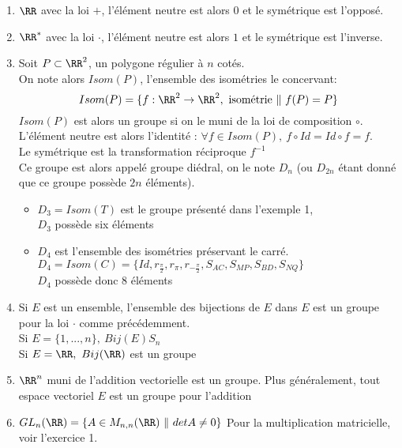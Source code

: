 \documentclass[../main.tex]{subfile}
\begin{document}
\begin{ex}
\begin{enumerate}	
	\item $\RR$ avec la loi $+$, l'élément neutre est alors $0$ et le symétrique est l'opposé.
	\item $\RR^*$ avec la loi $\cdot$, l'élément neutre est alors $1$ et le symétrique est l'inverse.
	\item Soit $P \subset \RR^2$, un polygone régulier à $n$ cotés.\\
	On note alors $Isom(P)$, l'ensemble des isométries le concervant:
	$$Isom(P) = \{f:\RR^2 \to \RR^2, \ \text{isométrie} \ \| \ f(P) = P\}$$
	$Isom(P)$ est alors un groupe si on le muni de la loi de composition $\circ$.\\
	L'élément neutre est alors l'identité : $\forall f \in Isom(P), \ f \circ Id = Id \circ f = f$.\\
	Le symétrique est la transformation réciproque $f^{-1}$
	\\
	Ce groupe est alors appelé groupe diédral, on le note $D_n$ (ou $D_{2n}$ étant donné que ce groupe possède $2n$ éléments).
	\begin{ex}	
	\begin{itemize}	
		\item $D_3 = Isom(T)$ est le groupe présenté dans l'exemple 1, \\
		$D_3$ possède six éléments
		\item $D_4$ est l'ensemble des isométries préservant le carré.\\
		$D_4 = Isom(C) = \{Id, r_{\frac{\pi}{2}}, r_{\pi}, r_{-\frac{\pi}{2}}, S_{AC}, S_{MP}, S_{BD}, S_{NQ}\}$ \\
		$D_4$ possède donc 8 éléments
	\end{itemize}
	\end{ex}
	\item Si $E$ est un ensemble, l'ensemble des bijections de $E$ dans $E$ est un groupe pour la loi $\cdot$ comme précédemment.\\
	Si $E = \{1, ..., n\}, \ Bij(E)S_n$\\
	Si $E = \RR, \ Bij(\RR)$ est un groupe
	\item $\RR^n$ muni de l'addition vectorielle est un groupe.
	Plus généralement, tout espace vectoriel $E$ est un groupe pour l'addition
	\item $GL_n(\RR) = \{A\in M_{n,n}(\RR) \ \| \ det A \neq 0\}$
	Pour la multiplication matricielle, voir l'exercice 1.
\end{enumerate}


\end{ex}
\end{document}
